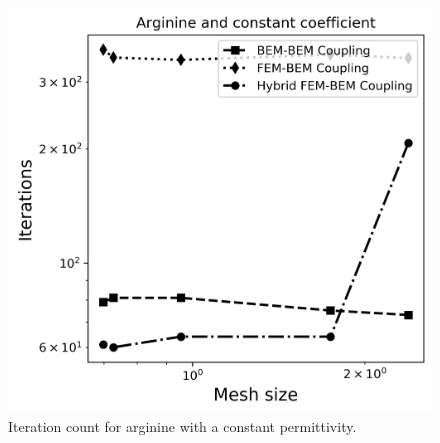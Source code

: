 \begin{figure}
\centering
  \includegraphics[width=0.6\linewidth]{Arginine_const_coeff_iter.png}
\caption{Iteration count for arginine with a constant permittivity. %
}
\label{fig:arg_contant_iter}
\end{figure}



